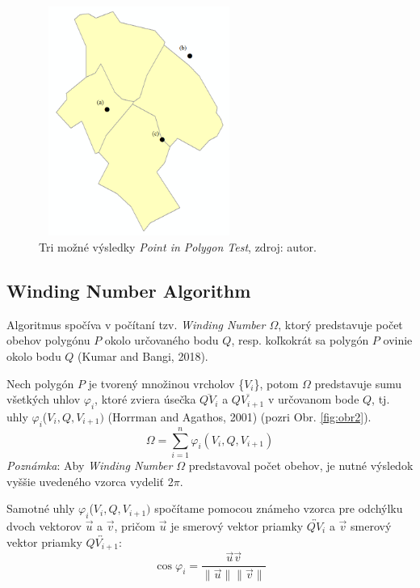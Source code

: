 \documentclass[11pt]{article}
\begin{document}
\newpage

\begin{figure}[h]
    \includegraphics[width=6.56cm, height=7.5cm]{obr1.png}
    \centering
    \caption{Tri možné výsledky \textit{Point in Polygon Test}, zdroj: autor.}
    \label{fig:obr1}
\end{figure}

\subsection{Winding Number Algorithm}\label{wn}
Algoritmus spočíva v počítaní tzv. \textit{Winding Number $\varOmega$}, ktorý predstavuje počet obehov
polygónu $P$ okolo určovaného bodu $Q$, resp. koľkokrát sa polygón $P$ ovinie okolo bodu $Q$ (Kumar and Bangi, 2018).

Nech polygón $P$ je tvorený množinou vrcholov \{$V_i$\}, potom $\varOmega$ predstavuje sumu všetkých uhlov $\varphi_i$, ktoré zviera úsečka $\overline{Q V_i}$ a $\overline{Q V_{i+1}}$ v určovanom bode $Q$, tj. uhly $\varphi_i$($V_i, Q, V_{i+1})$ (Horrman and Agathos, 2001) (pozri Obr. \ref{fig:obr2}).
\begin{equation*}
\varOmega=\sum_{i=1}^{n} \varphi_i(V_i, Q, V_{i+1})
\end{equation*}
\textit{Poznámka}: Aby \textit{Winding Number $\varOmega$} predstavoval počet obehov, je nutné výsledok vyššie uvedeného vzorca vydeliť 2$\pi$.

Samotné uhly $\varphi_i$($V_i, Q, V_{i+1})$ spočítame pomocou známeho vzorca pre odchýlku dvoch vektorov $\vec{u}$ a $\vec{v}$, pričom $\vec{u}$ je smerový vektor priamky $\overleftrightarrow{QV_i}$ a $\vec{v}$ smerový vektor priamky $\overleftrightarrow{QV_{i+1}}$:
\begin{equation*}
\cos\varphi_i=\frac{\vec{u}\vec{v}}{\lVert\vec{u}\rVert\lVert\vec{v}\rVert}
\end{equation*}
\end{document}
